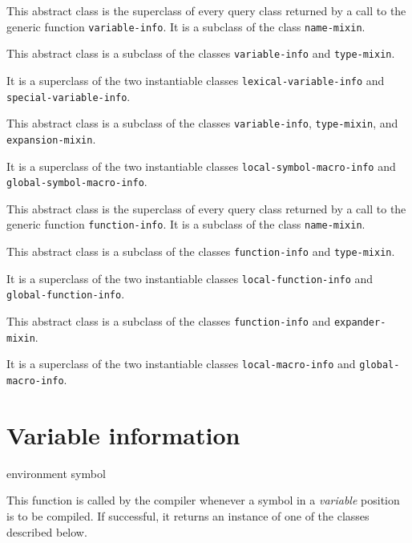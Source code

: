 
This abstract class is the superclass of every query class returned by
a call to the generic function \texttt{variable-info}.  It is a
subclass of the class \texttt{name-mixin}.


This abstract class is a subclass of the classes
\texttt{variable-info} and \texttt{type-mixin}.

It is a superclass of the two instantiable classes
\texttt{lexical-variable-info} and
\texttt{special-variable-info}.


This abstract class is a subclass of the classes
\texttt{variable-info}, \texttt{type-mixin}, and
\texttt{expansion-mixin}.

It is a superclass of the two instantiable classes
\texttt{local-symbol-macro-info} and
\texttt{global-symbol-macro-info}.


This abstract class is the superclass of every query class returned by
a call to the generic function \texttt{function-info}.  It is a
subclass of the class \texttt{name-mixin}.


This abstract class is a subclass of the classes
\texttt{function-info} and \texttt{type-mixin}.

It is a superclass of the two instantiable classes
\texttt{local-function-info} and
\texttt{global-function-info}.


This abstract class is a subclass of the classes
\texttt{function-info} and \texttt{expander-mixin}.

It is a superclass of the two instantiable classes
\texttt{local-macro-info} and
\texttt{global-macro-info}.

\section{Variable information}

 {environment symbol}

This function is called by the compiler whenever a symbol in a
\emph{variable} position is to be compiled.  If successful, it returns an instance of
one of the classes described below.


